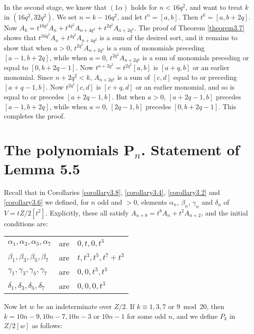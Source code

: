 \documentclass{monsky2009}
\begin{document}
In the second stage, we know that $(1\alpha)$ holds for $n<16q^{2}$, and want to treat $k$ in $(16q^{2},32q^{2})$. We set $n=k-16q^{2}$, and let $t^{n}=[a,b]$.  Then $t^{k}=[a,b+2q]$. Now $A_{k}=t^{16q^{2}}A_{n}+t^{4q^{2}}A_{n+4q^{2}}+t^{2q^{2}}A_{n+2q^{2}}$. The proof of Theorem \ref{theorem3.7} shows that $t^{16q^{2}}A_{n}+t^{4q^{2}}A_{n+4q^{2}}$ is a sum of the desired sort, and it remains to show that when $a>0$, $t^{2q^{2}}A_{n+2q^{2}}$ is a sum of monomials preceding $[a-1,b+2q]$, while when $a=0$, $t^{2q^{2}}A_{n+2q^{2}}$ is a sum of monomials preceding or equal to $[0, b+2q-1]$. Now $t^{n+2q^{2}}=t^{2q^{2}}[a,b]$ is $[a+q,b]$ or an earlier monomial. Since $n+2q^{2}<k$, $A_{n+2q^{2}}$ is a sum of $[c,d]$ equal to or preceding $[a+q-1,b]$. Now $t^{2q^{2}}[c,d]$ is $[c+q,d]$ or an earlier monomial, and so is equal to or precedes $[a+2q-1,b]$. But when $a>0$, $[a+2q-1,b]$ precedes $[a-1,b+2q]$, while when $a=0$, $[2q-1,b]$ precedes $[0,b+2q-1]$. This completes the proof.

\section{The polynomials $\bm P_{n}$. Statement of Lemma 5.5}
\label{section5}

Recall that in Corollaries \ref{corollary3.8}, \ref{corollary3.4}, \ref{corollary3.2} and \ref{corollary3.6} we defined, for $n$ odd and $>0$, elements $\alpha_{n}$, $\beta_{n}$, $\gamma_{n}$ and $\delta_{n}$ of $V=tZ/2[t^{2}]$. Explicitly, these all satisfy $A_{n+8}=t^{8}A_{n}+t^{2}A_{n+2}$, and the initial conditions are:

\renewcommand{\arraystretch}{1.0} %
\begin{center}
\begin{tabular}{lcl}
$\alpha_{1}, \alpha_{3}, \alpha_{5}, \alpha_{7}$ &are& $0,t,0,t^{5}$\\
$\beta_{1}, \beta_{3}, \beta_{5}, \beta_{7}$ &are& $t,t^{3},t^{5},t^{7}+t^{3}$\\
$\gamma_{1}, \gamma_{3}, \gamma_{5}, \gamma_{7}$ &are& $0,0,t^{3},t^{5}$\\
$\delta_{1}, \delta_{3}, \delta_{5}, \delta_{7}$ &are& $0,0,0,t^{3}$
\end{tabular}
\end{center}

Now let $w$ be an indeterminate over $Z/2$. If $k\equiv 1,3,7\mbox{ or }9\bmod{20}$, then $k=10n-9, 10n-7, 10n-3\mbox{ or }10n-1$ for some odd $n$, and we define $P_{k}$ in $Z/2[w]$ as follows:
\end{document}
